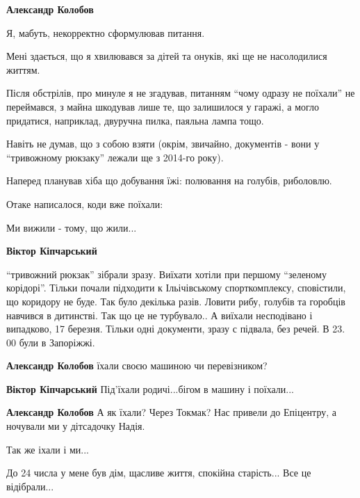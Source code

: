 \begin{itemize} %
\textbf{Александр Колобов} 

Я, мабуть, некорректно сформулював питання.

Мені здається, що я хвилювався за дітей та онуків, які ще не насолодилися
життям.

Після обстрілів, про минуле я не згадував, питанням \enquote{чому одразу не поїхали} не
переймався, з майна шкодував лише те, що залишилося у гаражі, а могло
придатися, наприклад, двуручна пилка, паяльна лампа тощо.

Навіть не думав, що з собою взяти (окрім, звичайно, документів - вони у
\enquote{тривожному рюкзаку} лежали ще з 2014-го року).

Наперед планував хіба що добування їжі: полювання на голубів, риболовлю.

Отаке написалося, коди вже поїхали:

Ми вижили - тому, що жили...

\textbf{Віктор Кіпчарський} 

\enquote{тривожний рюкзак} зібрали зразу. Виїхати хотіли при першому \enquote{зеленому
корідорі}. Тільки почали підходити к Ільічівському спорткомплексу, сповістили, що
коридору не буде. Так було декілька разів. Ловити рибу, голубів та горобців
навчився в дитинстві. Так що це не турбувало.. А виїхали несподівано і
випадково, 17 березня. Тільки одні документи, зразу с підвала, без речей. В 23. 00
були в Запоріжжі.

\textbf{Александр Колобов} їхали своєю машиною чи перевізником?

\textbf{Віктор Кіпчарський} Під'їхали родичі...бігом в машину і поїхали...

\textbf{Александр Колобов} А як їхали? Через Токмак?
Нас привели до Епіцентру, а ночували ми у дітсадочку Надія.


Так же іхали і ми...

\end{itemize} %


До 24 числа у мене був дім, щасливе життя, спокійна старість... Все це відібрали...
